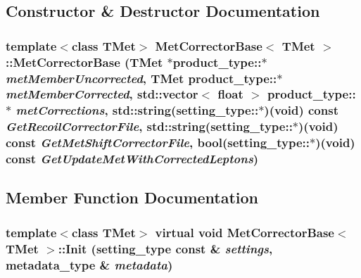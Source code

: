 \subsection{Constructor \& Destructor Documentation}
\hypertarget{classMetCorrectorBase_aa81947e3ed5338e560a872c4496cfb05}{
\subsubsection[{MetCorrectorBase}]{\setlength{\rightskip}{0pt plus 5cm}template$<$class TMet$>$ {\bf MetCorrectorBase}$<$ TMet $>$::{\bf MetCorrectorBase} (TMet $\ast$product\_\-type::$\ast$ {\em metMemberUncorrected}, \/  TMet product\_\-type::$\ast$ {\em metMemberCorrected}, \/  std::vector$<$ float $>$ product\_\-type::$\ast$ {\em metCorrections}, \/  std::string(setting\_\-type::$\ast$)(void) const  {\em GetRecoilCorrectorFile}, \/  std::string(setting\_\-type::$\ast$)(void) const  {\em GetMetShiftCorrectorFile}, \/  bool(setting\_\-type::$\ast$)(void) const  {\em GetUpdateMetWithCorrectedLeptons})}}
\label{classMetCorrectorBase_aa81947e3ed5338e560a872c4496cfb05}


\subsection{Member Function Documentation}
\hypertarget{classMetCorrectorBase_a16b625ee626c0cead5c6c4d65ac180e4}{
\subsubsection[{Init}]{\setlength{\rightskip}{0pt plus 5cm}template$<$class TMet$>$ virtual void {\bf MetCorrectorBase}$<$ TMet $>$::Init (setting\_\-type const \& {\em settings}, \/  metadata\_\-type \& {\em metadata})}}
\label{classMetCorrectorBase_a16b625ee626c0cead5c6c4d65ac180e4}


